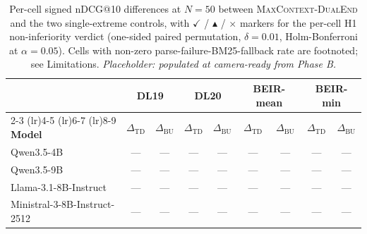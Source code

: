 
\begin{table}[t]
\centering
\small
\caption{Per-cell signed nDCG@10 differences at $N{=}50$ between \textsc{MaxContext-DualEnd} and the two single-extreme controls, with $\checkmark$ / $\blacktriangle$ / $\times$ markers for the per-cell H1 non-inferiority verdict (one-sided paired permutation, $\delta{=}0.01$, Holm-Bonferroni at $\alpha{=}0.05$). Cells with non-zero parse-failure-BM25-fallback rate are footnoted; see Limitations. \textit{Placeholder: populated at camera-ready from Phase B.}}
\label{tab:main-deltas}
\begin{tabular}{l cc cc cc cc}
\toprule
& \multicolumn{2}{c}{\textbf{DL19}} & \multicolumn{2}{c}{\textbf{DL20}} & \multicolumn{2}{c}{\textbf{BEIR-mean}} & \multicolumn{2}{c}{\textbf{BEIR-min}} \\
\cmidrule(lr){2-3} \cmidrule(lr){4-5} \cmidrule(lr){6-7} \cmidrule(lr){8-9}
\textbf{Model} & $\Delta_{\mathrm{TD}}$ & $\Delta_{\mathrm{BU}}$ & $\Delta_{\mathrm{TD}}$ & $\Delta_{\mathrm{BU}}$ & $\Delta_{\mathrm{TD}}$ & $\Delta_{\mathrm{BU}}$ & $\Delta_{\mathrm{TD}}$ & $\Delta_{\mathrm{BU}}$ \\
\midrule
Qwen3.5-4B & --- & --- & --- & --- & --- & --- & --- & --- \\
Qwen3.5-9B & --- & --- & --- & --- & --- & --- & --- & --- \\
Llama-3.1-8B-Instruct & --- & --- & --- & --- & --- & --- & --- & --- \\
Ministral-3-8B-Instruct-2512 & --- & --- & --- & --- & --- & --- & --- & --- \\
\bottomrule
\end{tabular}
\end{table}
